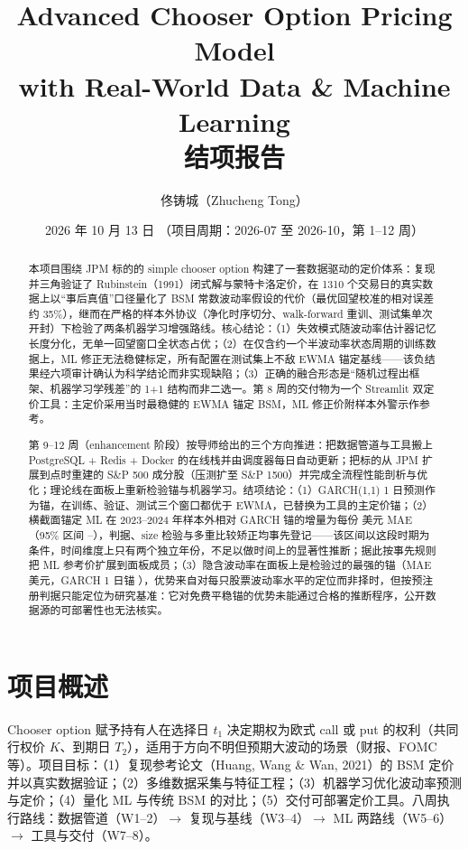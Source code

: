 \documentclass[11pt]{ctexart}
\title{\textbf{Advanced Chooser Option Pricing Model\\ with Real-World Data \& Machine Learning}\\
\Large 结项报告}
\author{佟铸城（Zhucheng Tong）}
\date{2026 年 10 月 13 日 \quad（项目周期：2026-07 至 2026-10，第 1--12 周）}
\begin{document}
\maketitle

\begin{abstract}
本项目围绕 JPM 标的的 simple chooser option 构建了一套数据驱动的定价体系：复现并三角验证了 Rubinstein（1991）闭式解与蒙特卡洛定价，在 1310 个交易日的真实数据上以“事后真值”口径量化了 BSM 常数波动率假设的代价（最优回望校准的相对误差约 35\%），继而在严格的样本外协议（净化时序切分、walk-forward 重训、测试集单次开封）下检验了两条机器学习增强路线。核心结论：（1）失效模式随波动率估计器记忆长度分化，无单一回望窗口全状态占优；（2）在仅含约一个半波动率状态周期的训练数据上，ML 修正无法稳健标定，所有配置在测试集上不敌 EWMA 锚定基线——该负结果经六项审计确认为科学结论而非实现缺陷；（3）正确的融合形态是“随机过程出框架、机器学习学残差”的 1+1 结构而非二选一。第 8 周的交付物为一个 Streamlit 双定价工具：主定价采用当时最稳健的 EWMA 锚定 BSM，ML 修正价附样本外警示作参考。

第 9--12 周（enhancement 阶段）按导师给出的三个方向推进：把数据管道与工具搬上 PostgreSQL + Redis + Docker 的在线栈并由调度器每日自动更新；把标的从 JPM 扩展到点时重建的 S\&P 500 成分股（压测扩至 S\&P 1500）并完成全流程性能剖析与优化；理论线在面板上重新检验锚与机器学习。结项结论：（1）GARCH(1,1) 1 日预测作为锚，在训练、验证、测试三个窗口都优于 EWMA，已替换为工具的主定价锚；（2）横截面锚定 ML 在 2023--2024 年样本外相对 GARCH 锚的增量为每份 \rnHTwoDelta{} 美元 MAE（95\% 区间 \rnHTwoLo{}--\rnHTwoHi），判据、size 检验与多重比较矫正均事先登记——该区间以这段时期为条件，时间维度上只有两个独立年份，不足以做时间上的显著性推断；据此按事先规则把 ML 参考价扩展到面板成员；（3）隐含波动率在面板上是检验过的最强的锚（MAE \rnIvMaeIv{} 美元，GARCH 1 日锚 \rnIvMaeGd），优势来自对每只股票波动率水平的定位而非择时，但按预注册判据只能定位为研究基准：它对免费平稳锚的优势未能通过合格的推断程序，公开数据源的可部署性也无法核实。
\end{abstract}

\clearpage
{\small\setlength{\parskip}{0pt}\tableofcontents}
\newpage

\section{项目概述}
Chooser option 赋予持有人在选择日 $t_1$ 决定期权为欧式 call 或 put 的权利（共同行权价 $K$、到期日 $T_2$），适用于方向不明但预期大波动的场景（财报、FOMC 等）。项目目标：（1）复现参考论文（Huang, Wang \& Wan, 2021）的 BSM 定价并以真实数据验证；（2）多维数据采集与特征工程；（3）机器学习优化波动率预测与定价；（4）量化 ML 与传统 BSM 的对比；（5）交付可部署定价工具。八周执行路线：数据管道（W1--2）$\to$ 复现与基线（W3--4）$\to$ ML 两路线（W5--6）$\to$ 工具与交付（W7--8）。
\end{document}
